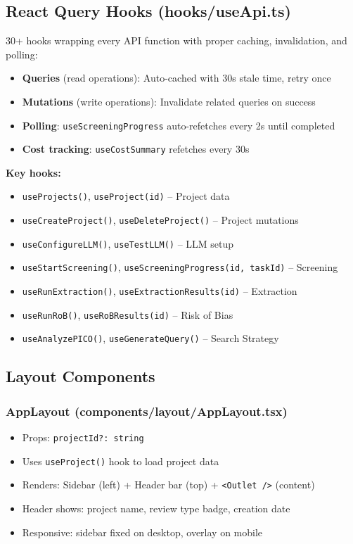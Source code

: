 \documentclass[11pt,a4paper]{article}
\begin{document}
\subsection{React Query Hooks (hooks/useApi.ts)}

30+ hooks wrapping every API function with proper caching, invalidation, and polling:

\begin{itemize}[nosep]
  \item \textbf{Queries} (read operations): Auto-cached with 30s stale time, retry once
  \item \textbf{Mutations} (write operations): Invalidate related queries on success
  \item \textbf{Polling}: \texttt{useScreeningProgress} auto-refetches every 2s until completed
  \item \textbf{Cost tracking}: \texttt{useCostSummary} refetches every 30s
\end{itemize}

\textbf{Key hooks:}
\begin{itemize}[nosep]
  \item \texttt{useProjects()}, \texttt{useProject(id)} -- Project data
  \item \texttt{useCreateProject()}, \texttt{useDeleteProject()} -- Project mutations
  \item \texttt{useConfigureLLM()}, \texttt{useTestLLM()} -- LLM setup
  \item \texttt{useStartScreening()}, \texttt{useScreeningProgress(id, taskId)} -- Screening
  \item \texttt{useRunExtraction()}, \texttt{useExtractionResults(id)} -- Extraction
  \item \texttt{useRunRoB()}, \texttt{useRoBResults(id)} -- Risk of Bias
  \item \texttt{useAnalyzePICO()}, \texttt{useGenerateQuery()} -- Search Strategy
\end{itemize}

\subsection{Layout Components}

\subsubsection{AppLayout (components/layout/AppLayout.tsx)}

\begin{itemize}[nosep]
  \item Props: \texttt{projectId?: string}
  \item Uses \texttt{useProject()} hook to load project data
  \item Renders: Sidebar (left) + Header bar (top) + \texttt{<Outlet />} (content)
  \item Header shows: project name, review type badge, creation date
  \item Responsive: sidebar fixed on desktop, overlay on mobile
\end{itemize}
\end{document}
